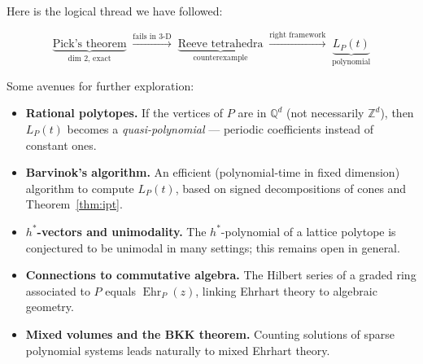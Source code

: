 \documentclass[11pt]{article}
\theoremstyle{plain}
\theoremstyle{definition}
\newcommand{\Z}{\mathbb{Z}}
\newcommand{\Q}{\mathbb{Q}}
\begin{document}
Here is the logical thread we have followed:

\[
  \underbrace{\text{Pick's theorem}}_{\text{dim 2, exact}}
  \;\xrightarrow{\text{fails in 3-D}}\;
  \underbrace{\text{Reeve tetrahedra}}_{\text{counterexample}}
  \;\xrightarrow{\text{right framework}}\;
  \underbrace{L_P(t)}_{\text{polynomial}}
\]
\begin{figure}[H]
\centering
{}
\end{figure}
Some avenues for further exploration:
\begin{itemize}
  \item \textbf{Rational polytopes.}  If the vertices of $P$ are in $\Q^d$
        (not necessarily $\Z^d$), then $L_P(t)$ becomes a \emph{quasi-polynomial}
        — periodic coefficients instead of constant ones.
  \item \textbf{Barvinok's algorithm.}  An efficient (polynomial-time in fixed
        dimension) algorithm to compute $L_P(t)$, based on signed
        decompositions of cones and Theorem~\ref{thm:ipt}.
  \item \textbf{$h^*$-vectors and unimodality.}  The $h^*$-polynomial of a
        lattice polytope is conjectured to be unimodal in many settings; this
        remains open in general.
  \item \textbf{Connections to commutative algebra.}  The Hilbert series of a
        graded ring associated to $P$ equals $\operatorname{Ehr}_P(z)$,
        linking Ehrhart theory to algebraic geometry.
  \item \textbf{Mixed volumes and the BKK theorem.}  Counting solutions of
        sparse polynomial systems leads naturally to mixed Ehrhart theory.
\end{itemize}
\end{document}
